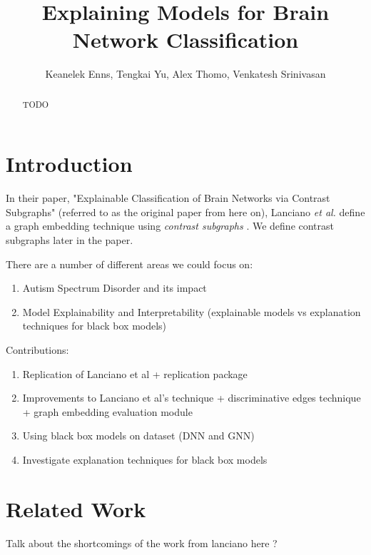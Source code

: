 \documentclass[letterpaper]{article}
\author{
Keanelek Enns, Tengkai Yu, Alex Thomo, Venkatesh Srinivasan\\
}
\title{Explaining Models for Brain Network Classification}
\begin{document}
\maketitle

\begin{abstract}
TODO
\end{abstract}



\section{Introduction}

In their paper, "Explainable Classification of Brain Networks via Contrast Subgraphs" (referred to as the original paper from here on),
Lanciano \emph{et al.} define a graph embedding technique using \emph{contrast subgraphs} \cite{lanciano2020}. We define contrast subgraphs later in the paper.

There are a number of different areas we could focus on:
\begin{enumerate}
    \item Autism Spectrum Disorder and its impact
    \item Model Explainability and Interpretability (explainable models vs explanation techniques for black box models)
\end{enumerate}

Contributions:
\begin{enumerate}
    \item Replication of Lanciano et al \cite{lanciano2020} + replication package
    \item Improvements to Lanciano et al's technique + discriminative edges technique + graph embedding evaluation module
    \item Using black box models on dataset (DNN and GNN)
    \item Investigate explanation techniques for black box models
\end{enumerate}



\section{Related Work}


Talk about the shortcomings of the work from lanciano here \cite{lanciano2020}?
\end{document}
